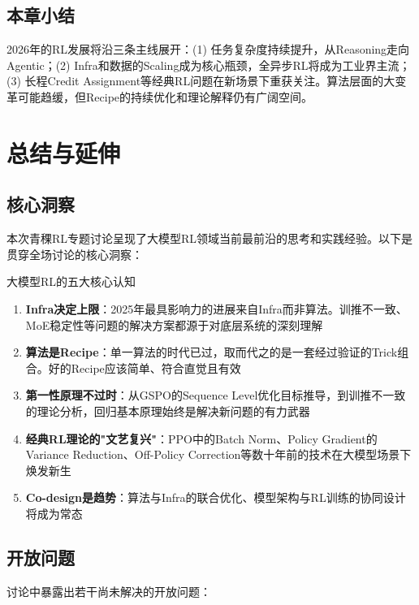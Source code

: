\documentclass[a4paper]{article}
\begin{document}
\subsection{本章小结}

2026年的RL发展将沿三条主线展开：(1) 任务复杂度持续提升，从Reasoning走向Agentic；(2) Infra和数据的Scaling成为核心瓶颈，全异步RL将成为工业界主流；(3) 长程Credit Assignment等经典RL问题在新场景下重获关注。算法层面的大变革可能趋缓，但Recipe的持续优化和理论解释仍有广阔空间。


\section{总结与延伸}

\subsection{核心洞察}

本次青稞RL专题讨论呈现了大模型RL领域当前最前沿的思考和实践经验。以下是贯穿全场讨论的核心洞察：

\begin{importantbox}{大模型RL的五大核心认知}
\begin{enumerate}
    \item \textbf{Infra决定上限}：2025年最具影响力的进展来自Infra而非算法。训推不一致、MoE稳定性等问题的解决方案都源于对底层系统的深刻理解
    \item \textbf{算法是Recipe}：单一算法的时代已过，取而代之的是一套经过验证的Trick组合。好的Recipe应该简单、符合直觉且有效
    \item \textbf{第一性原理不过时}：从GSPO的Sequence Level优化目标推导，到训推不一致的理论分析，回归基本原理始终是解决新问题的有力武器
    \item \textbf{经典RL理论的"文艺复兴"}：PPO中的Batch Norm、Policy Gradient的Variance Reduction、Off-Policy Correction等数十年前的技术在大模型场景下焕发新生
    \item \textbf{Co-design是趋势}：算法与Infra的联合优化、模型架构与RL训练的协同设计将成为常态
\end{enumerate}
\end{importantbox}

\subsection{开放问题}

讨论中暴露出若干尚未解决的开放问题：
\end{document}
